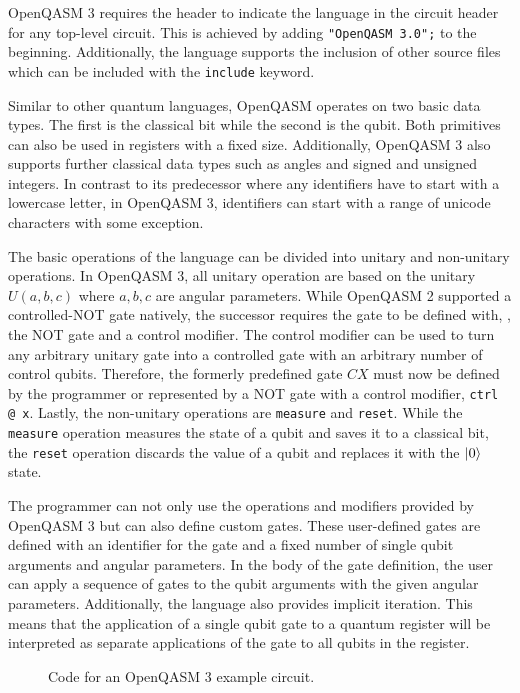 OpenQASM 3 requires the header to indicate the language in the circuit header for any top-level circuit. This is achieved by adding \texttt{"OpenQASM 3.0";} to the beginning. Additionally, the language supports the inclusion of other source files which can be included with the \texttt{include} keyword.

Similar to other quantum languages, OpenQASM operates on two basic data types. The first is the classical bit while the second is the qubit. Both primitives can also be used in registers with a fixed size. Additionally, OpenQASM 3 also supports further classical data types such as angles and signed and unsigned integers.
In contrast to its predecessor where any identifiers have to start with a lowercase letter, in OpenQASM 3, identifiers can start with a range of unicode characters with some exception. 

The basic operations of the language can be divided into unitary and non-unitary operations. In OpenQASM 3, all unitary operation are based on the unitary $U(a,b,c)$ where $a,b,c$ are angular parameters.
While OpenQASM 2 supported a controlled-NOT gate natively, the successor requires the gate to be defined with, \eg, the NOT gate and a control modifier. The control modifier can be used to turn any arbitrary unitary gate into a controlled gate with an arbitrary number of control qubits. Therefore, the formerly predefined gate $CX$ must now be defined by the programmer or represented by a NOT gate with a control modifier, \eg \texttt{ctrl @ x}. Lastly, the non-unitary operations are \texttt{measure} and \texttt{reset}. While the \texttt{measure} operation measures the state of a qubit and saves it to a classical bit, the \texttt{reset} operation discards the value of a qubit and replaces it with the $\ket{0}$ state.

The programmer can not only use the operations and modifiers provided by OpenQASM 3 but can also define custom gates. These user-defined gates are defined with an identifier for the gate and a fixed number of single qubit arguments and angular parameters. In the body of the gate definition, the user can apply a sequence of gates to the qubit arguments with the given angular parameters. Additionally, the language also provides implicit iteration. This means that the application of a single qubit gate to a quantum register will be interpreted as separate applications of the gate to all qubits in the register.

\begin{figure}[htp]
    \centering     
    
    \caption{Code for an OpenQASM 3 example circuit.}
    \label{fig:qasm_example}
\end{figure}

